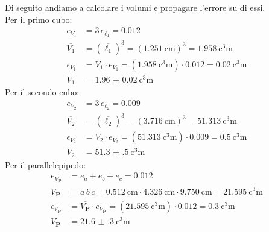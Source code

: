 \documentclass[12pt]{scrartcl}
\begin{document}
Di seguito andiamo a calcolare i volumi e propagare l'errore su di essi.\\[1em]
%
Per il primo cubo:
\begin{align*}
  e_{V_1} &= 3 \, e_{\ell_1} = \num{0.012} \\
  \overline{V_1} &= \left( \overline{\ell_1} \right)^3 = \left( \SI{1.251}{\centi\metre} \right)^3 = \SI{1.958}{\cubic\centi\metre} \\
  \epsilon_{V_1} &= \overline{V_1} \cdot e_{V_1} = \left(\SI{1.958}{\cubic\centi\metre}\right) \cdot \num{0.012} = \SI{0.02}{\cubic\centi\metre} \\
  V_1 &= \SI{1.96(2)}{\cubic\centi\metre}
\end{align*}
%
Per il secondo cubo:
\begin{align*}
  e_{V_2} &= 3 \, e_{\ell_2} = \num{0.009} \\
  \overline{V_2} &= \left( \overline{\ell_2} \right)^3 = \left( \SI{3.716}{\centi\metre} \right)^3 = \SI{51.313}{\cubic\centi\metre} \\
  \epsilon_{V_2} &= \overline{V_2} \cdot e_{V_2} = \left(\SI{51.313}{\cubic\centi\metre}\right) \cdot \num{0.009} = \SI{0.5}{\cubic\centi\metre} \\
  V_2 &= \SI{51.3(5)}{\cubic\centi\metre}
\end{align*}
%
Per il parallelepipedo:
\begin{align*}
  e_{V_\textbf{P}} &= e_{a} + e_{b} + e_{c} = \num{0.012} \\
  \overline{V_\textbf{P}} &= a \, b \, c = \SI{0.512}{\centi\metre} \cdot \SI{4.326}{\centi\metre} \cdot \SI{9.750}{\centi\metre} = \SI{21.595}{\cubic\centi\metre} \\
  \epsilon_{V_\textbf{P}} &= \overline{V_\textbf{P}} \cdot e_{V_\textbf{P}} = \left(\SI{21.595}{\cubic\centi\metre}\right) \cdot \num{0.012} = \SI{0.3}{\cubic\centi\metre} \\
  V_\textbf{P} &= \SI{21.6(3)}{\cubic\centi\metre}
\end{align*}
\end{document}
